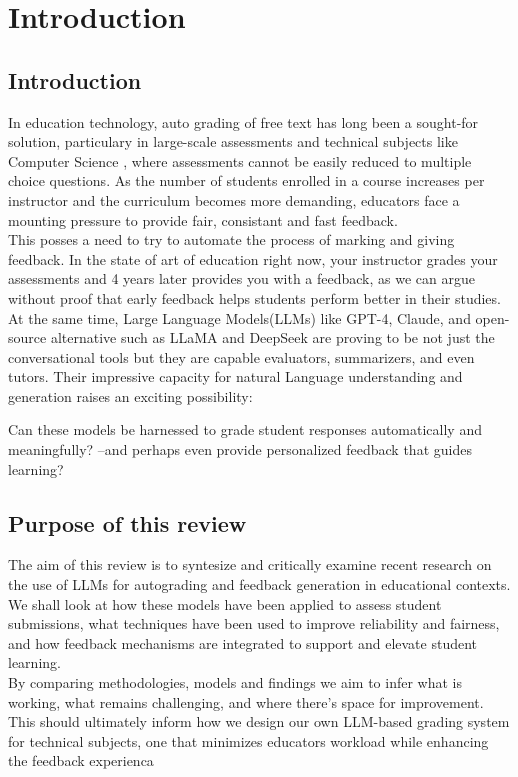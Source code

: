 \documentclass[a4paper,twoside,12pt]{report}
\begin{document}
\chapter{Introduction}
\section{Introduction}
  In education technology, auto grading of free text has long been a sought-for solution,
  particulary in large-scale assessments and technical subjects like Computer Science , where
  assessments cannot be easily reduced to multiple choice questions. As the number of students enrolled in 
  a course increases per instructor and the curriculum becomes more demanding, educators face a mounting pressure
  to provide fair, consistant and fast feedback.\\

  This posses a need to try to automate the process of marking and giving feedback. In the
  state of art of education right now, your instructor grades your assessments and 4 years later 
  provides you with a feedback, as we can argue without proof that early feedback helps students 
  perform better in their studies. \\

At the same time, Large Language Models(LLMs) like GPT-4, Claude, and open-source alternative
such as LLaMA and DeepSeek are proving to be not just the conversational tools but
they are capable evaluators, summarizers, and even tutors. Their impressive capacity
for natural Language understanding and generation raises an exciting possibility:

Can these models be harnessed to grade student responses automatically and meaningfully?
--and perhaps even provide personalized feedback that guides learning?


\section{Purpose of this review}
The aim of this review is to syntesize and critically examine recent research
on the use of LLMs for autograding and feedback generation in educational contexts.
We shall look at how these models have been applied to assess student submissions,
what techniques have been used to improve reliability and fairness, and how feedback
mechanisms are integrated to support and elevate student learning.\\
By comparing methodologies, models and findings we aim to infer what is 
working, what remains challenging, and where there's space for improvement.
This should ultimately inform how we design our own LLM-based grading system 
for technical subjects, one that minimizes educators workload while enhancing the feedback experienca 
\end{document}
